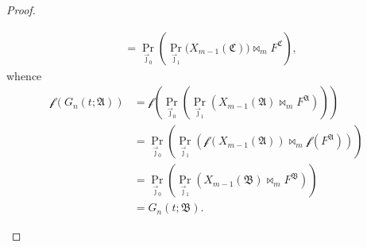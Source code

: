 \documentclass[a4paper]{amsart}
\theoremstyle{definition}
\theoremstyle{remark}
\newcommand{\A}{\mathcal{A}}
\newcommand{\B}{\mathcal{B}}
\newcommand{\C}{\mathcal{C}}
\theoremstyle{definition}
\renewcommand{\A}{\mathfrak{A}}
\renewcommand{\B}{\mathfrak{B}}
\renewcommand{\C}{\mathfrak{C}}
\newcommand{\f}{\mathcal{f}}
\begin{document}
\begin{proof}
\begin{enumerate}
\begin{align*}
            &= \Pr_{\vec\jmath_0}\left(\Pr_{\vec\jmath_1}\big( X_{m-1}(\C)  \big)\bowtie_m F^\C \right),
        \end{align*}
        whence
        \begin{align*}
            \f(G_n(t;\A)) &= \f\left( \Pr_{\vec\jmath_0}\left(\Pr_{\vec\jmath_1}\left( X_{m-1}(\A) \bowtie_m F^\A \right)\right) \right) \\
            &= \Pr_{\vec\jmath_0}\left(\Pr_{\vec\jmath_1}\left( \f(X_{m-1}(\A)) \bowtie_m \f(F^\A) \right)\right) \\
            &= \Pr_{\vec\jmath_0}\left(\Pr_{\vec\jmath_1}\left( X_{m-1}(\B) \bowtie_m F^\B \right)\right) \\
            &= G_n(t;\B).
        \end{align*}
    \end{enumerate}


\end{proof}
\end{document}
